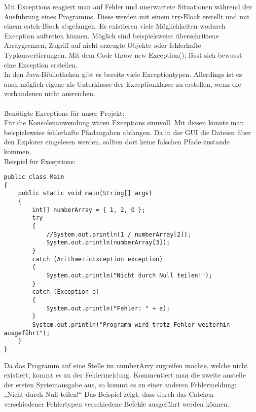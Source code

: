 Mit Exceptions reagiert man auf Fehler und unerwartete Situationen während der Ausführung eines Programms. Diese werden mit einem try-Block erstellt und mit einem catch-Block abgefangen. Es existieren viele Möglichkeiten wodurch Exception auftreten können. Möglich sind beispielsweise überschrittene Arraygrenzen, Zugriff auf nicht erzeugte Objekte oder fehlerhafte Typkonvertierungen. Mit dem Code throw new Exception(); lässt sich bewusst eine Exception erstellen.\\
In den Java-Bibliotheken gibt es bereits viele Exceptiontypen. Allerdings ist es auch möglich eigene als Unterklasse der Exceptionklasse zu erstellen, wenn die vorhandenen nicht ausreichen.\\\\
Benötigte Exceptions für unser Projekt: \\
Für die Konsolenanwendung wären Exceptions sinnvoll. Mit diesen könnte man beispielsweise fehlerhafte Pfadangaben abfangen. Da in der GUI die Dateien über den Explorer eingelesen werden, sollten dort keine falschen Pfade zustande kommen.\\
Beispiel für Exceptions:
\begin{lstlisting}
public class Main
{
	public static void main(String[] args)
	{		
		int[] numberArray = { 1, 2, 0 };
		try
		{
			//System.out.println(1 / numberArray[2]);
			System.out.println(numberArray[3]);
		}
		catch (ArithmeticException exception)
		{
			System.out.println("Nicht durch Null teilen!");
		}
		catch (Exception e)
		{
			System.out.println("Fehler: " + e);
		}
		System.out.println("Programm wird trotz Fehler weiterhin ausgeführt");
	}
}
\end{lstlisting}
Da das Programm auf eine Stelle im numberArry zugreifen möchte, welche nicht existiert, kommt es zu der Fehlermeldung. Kommentiert man die zweite anstelle der ersten Systemausgabe aus, so kommt es zu einer anderen Fehlermeldung: „Nicht durch Null teilen!“ Das Beispiel zeigt, dass durch das Catchen verschiedener Fehlertypen verschiedene Befehle ausgeführt werden können.
\nsecend
